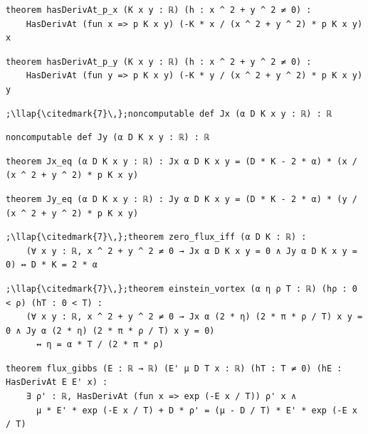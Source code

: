 \begin{lstlisting}[style=leancat]
theorem hasDerivAt_p_x (K x y : ℝ) (h : x ^ 2 + y ^ 2 ≠ 0) :
    HasDerivAt (fun x => p K x y) (-K * x / (x ^ 2 + y ^ 2) * p K x y) x
\end{lstlisting}

\begin{lstlisting}[style=leancat]
theorem hasDerivAt_p_y (K x y : ℝ) (h : x ^ 2 + y ^ 2 ≠ 0) :
    HasDerivAt (fun y => p K x y) (-K * y / (x ^ 2 + y ^ 2) * p K x y) y
\end{lstlisting}

\begin{lstlisting}[style=leancat]
;\llap{\citedmark{7}\,};noncomputable def Jx (α D K x y : ℝ) : ℝ
\end{lstlisting}

\begin{lstlisting}[style=leancat]
noncomputable def Jy (α D K x y : ℝ) : ℝ
\end{lstlisting}

\begin{lstlisting}[style=leancat]
theorem Jx_eq (α D K x y : ℝ) : Jx α D K x y = (D * K - 2 * α) * (x / (x ^ 2 + y ^ 2) * p K x y)
\end{lstlisting}

\begin{lstlisting}[style=leancat]
theorem Jy_eq (α D K x y : ℝ) : Jy α D K x y = (D * K - 2 * α) * (y / (x ^ 2 + y ^ 2) * p K x y)
\end{lstlisting}

\begin{lstlisting}[style=leancat]
;\llap{\citedmark{7}\,};theorem zero_flux_iff (α D K : ℝ) :
    (∀ x y : ℝ, x ^ 2 + y ^ 2 ≠ 0 → Jx α D K x y = 0 ∧ Jy α D K x y = 0) ↔ D * K = 2 * α
\end{lstlisting}

\begin{lstlisting}[style=leancat]
;\llap{\citedmark{7}\,};theorem einstein_vortex (α η ρ T : ℝ) (hρ : 0 < ρ) (hT : 0 < T) :
    (∀ x y : ℝ, x ^ 2 + y ^ 2 ≠ 0 → Jx α (2 * η) (2 * π * ρ / T) x y = 0 ∧ Jy α (2 * η) (2 * π * ρ / T) x y = 0)
      ↔ η = α * T / (2 * π * ρ)
\end{lstlisting}

\begin{lstlisting}[style=leancat]
theorem flux_gibbs (E : ℝ → ℝ) (E' μ D T x : ℝ) (hT : T ≠ 0) (hE : HasDerivAt E E' x) :
    ∃ ρ' : ℝ, HasDerivAt (fun x => exp (-E x / T)) ρ' x ∧
      μ * E' * exp (-E x / T) + D * ρ' = (μ - D / T) * E' * exp (-E x / T)
\end{lstlisting}

